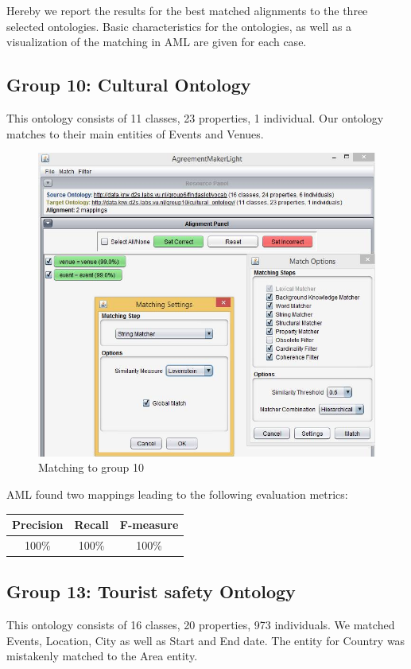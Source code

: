 \documentclass[runningheads,a4paper]{../../StyleFiles/llncs}
\begin{document}
Hereby we report the results for the best matched alignments to the three selected ontologies. Basic characteristics for the ontologies, as well as a visualization of the matching in AML are given for each case.

\subsection{Group 10: Cultural Ontology}
This ontology consists of 11 classes, 23 properties, 1 individual. Our ontology matches to their main entities of Events and Venues.

\begin{figure}[h]\centering
	\includegraphics[width=.7\textwidth]{img/match_g10.png}
	\caption{Matching to group 10}
	\label{fig:match_g10}
\end{figure}

AML found two mappings leading to the following evaluation metrics:

\begin{center}
	\begin{tabular}{| c | c | c |}
		\hline
		\textbf{Precision} & \textbf{Recall} & \textbf{F-measure} \\ \hline
		100\% & 100\% & 100\% \\ \hline
	\end{tabular}
\end{center}

\subsection{Group 13: Tourist safety Ontology}
This ontology consists of 16 classes, 20 properties, 973 individuals. We matched Events, Location, City as well as Start and End date. The entity for Country was mistakenly matched to the Area entity.
\end{document}
